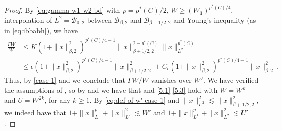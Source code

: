 \documentclass[final]{amsart}
\numberwithin{thm}{section}
\numberwithin{equation}{section}
\newcommand{\B}{\mathcal{B}}
\begin{document}
\begin{proof}
By \eqref{eq:gamma-w1-w2-bd} with $p = p^*(C)/2$, 
$W \geq (W_1)^{p^*(C)/4}$, interpolation of $L^2 = \B_{0,2}$ between
$\B_{\beta,2}$ and $\B_{\beta+1/2,2}$ and Young's inequality (as in \eqref{eq:ibbabh}), we have
\begin{align*}
    \frac{\Gamma W}{W} &\leq K(1+\|x\|_{\beta,2}^2)^{p^*(C)/4-1}\|x\|_{\beta+1/2,2}^{2-p^*(C)}\|x\|_{L^2}^{p^*(C)} \\
    &\leq \epsilon (1+\|x\|_{\beta,2}^2)^{p^*(C)/4-1}\|x\|_{\beta+1/2,2}^2 + C_\epsilon(1+\|x\|_{\beta,2}^2)^{p^*(C)/4-1}\|x\|_{\beta,2}^2 \,. 
\end{align*}
Thus,  by \ref{case-1} and  we conclude that $\Gamma W/W$ vanishes over $W'$. We have verified the assumptions of , so by  and  we have that
 and \ref{5.1}-\ref{5.3}  hold with  $W = W^k$ and $U = W^{2k}$, for any $k \geq 1$. By \eqref{eq:def-of-w'-case-1} and $\|x\|_{L^2}^2 \lesssim \|x\|_{\beta+1/2,2}^2$, we indeed have that $1+\|x\|_{L^1}^p + \|x\|_{L^2}^2 \lesssim W'$ and $1+\|x\|_{L^1}^p + \|x\|_{L^2}^2 \lesssim U'$.


\end{proof}
\end{document}
